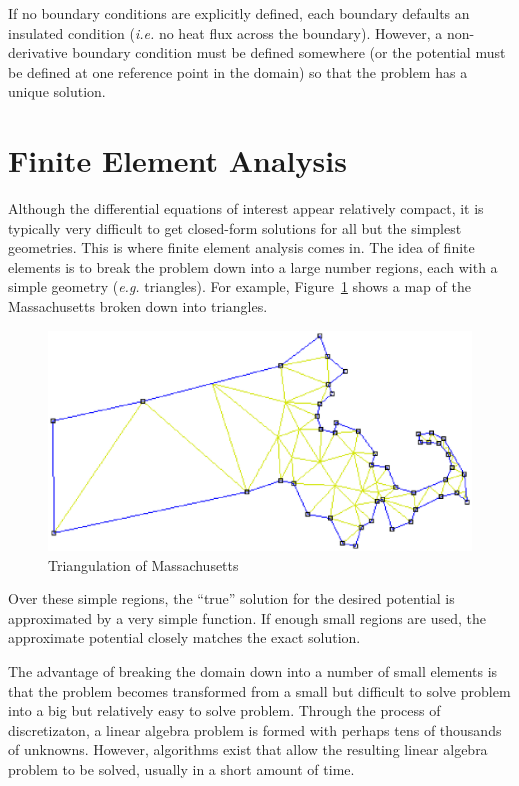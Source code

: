 \documentclass[12pt]{report}
\begin{document}
If no boundary conditions are explicitly defined, each boundary
defaults an insulated condition ({\em i.e.} no heat flux across the boundary).
However, a non-derivative boundary condition must be defined somewhere (or the
potential must be defined at one reference point in the domain) so
that the problem has a unique solution.

\section{Finite Element Analysis}

Although the differential equations of interest appear relatively
compact, it is typically very difficult to get closed-form
solutions for all but the simplest geometries.  This is where
finite element analysis comes in.  The idea of finite elements is
to break the problem down into a large number regions, each with a
simple geometry ({\em e.g.} triangles).  For example,
Figure~{\ref{mass}} shows a map of the Massachusetts broken down
into triangles.
\begin{figure}
\centerline{\includegraphics{mass.ps}}
\caption{Triangulation of Massachusetts}
\label{mass}
\end{figure}
Over these simple regions, the ``true'' solution for the desired
potential is approximated by a very simple function.  If enough
small regions are used, the approximate potential closely matches
the exact solution.

The advantage of breaking the domain down into a number of small
elements is that the problem becomes transformed from a small but
difficult to solve problem into a big but relatively easy to solve
problem.  Through the process of discretizaton, a linear algebra
problem is formed with perhaps tens of thousands of unknowns.
However, algorithms exist that allow the resulting linear algebra
problem to be solved, usually in a short amount of time.
\end{document}
